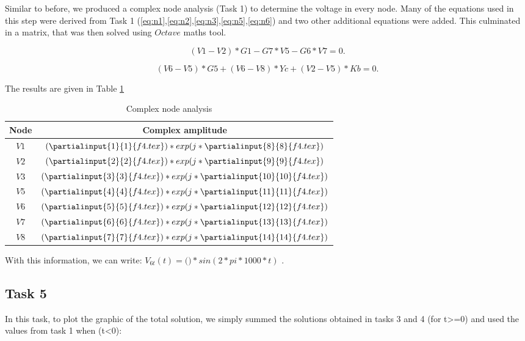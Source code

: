 \par Similar to before, we produced a complex node analysis (Task 1) to determine the voltage in every node. Many of the equations used in this step were derived from Task 1 (\ref{eq:n1},\ref{eq:n2},\ref{eq:n3},\ref{eq:n5},\ref{eq:n6}) and two other additional equations were added. This culminated in a matrix, that was then solved using $Octave$ maths tool.

\begin{equation}
 (V1 - V2)*G1 - G7*V5 - G6*V7 = 0.
\end{equation}

\begin{equation}
 (V6 - V5)*G5 + (V6 - V8)*Yc + (V2 - V5)*Kb = 0.
\end{equation}

\par The results are given in Table \ref{table:t4}
\begin{table}[!ht]
	\centering
	\begin{tabular}{ |c|c| }
	\hline
	 {\bf Node} & {\bf Complex amplitude} \\ 
	 \hline\hline
	 $V1$ & $(\partialinput{1}{1}{f4.tex})*exp(j*\partialinput{8}{8}{f4.tex})$   \\
	 \hline
	 $V2$ & $(\partialinput{2}{2}{f4.tex})*exp(j*\partialinput{9}{9}{f4.tex})$   \\
	 \hline
	 $V3$ & $(\partialinput{3}{3}{f4.tex})*exp(j*\partialinput{10}{10}{f4.tex})$   \\
	 \hline
	 $V5$ & $(\partialinput{4}{4}{f4.tex})*exp(j*\partialinput{11}{11}{f4.tex})$   \\
	 \hline
	 $V6$ & $(\partialinput{5}{5}{f4.tex})*exp(j*\partialinput{12}{12}{f4.tex})$   \\
	 \hline
	 $V7$ & $(\partialinput{6}{6}{f4.tex})*exp(j*\partialinput{13}{13}{f4.tex})$   \\
	 \hline
	 $V8$ & $(\partialinput{7}{7}{f4.tex})*exp(j*\partialinput{14}{14}{f4.tex})$   \\
	 \hline
	\end{tabular}
	\caption{Complex node analysis}
	\label{table:t4}
\end{table} 
 
With this information, we can write: $V_{6t}(t)=($$)*sin(2*pi*1000*t)$ .

\subsection{Task 5}
In this task, to plot the graphic of the total solution, we simply summed the solutions obtained in tasks 3 and 4 (for t>=0) and used the values from task 1 when (t<0):

